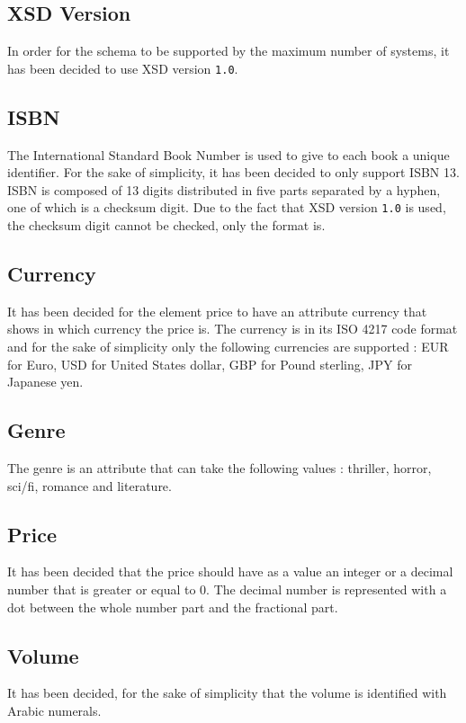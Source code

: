\documentclass{article}
\begin{document}
\subsection{XSD Version}
In order for the schema to be supported by the maximum number of systems, it has been decided to use XSD version \texttt{1.0}.

\subsection{ISBN}
The International Standard Book Number is used to give to each book a unique identifier. For the sake of simplicity, it has been decided to only support ISBN 13. ISBN is composed of 13 digits distributed in five parts separated by a hyphen, one of which is a checksum digit. Due to the fact that XSD version \texttt{1.0} is used, the checksum digit cannot be checked, only the format is.

\subsection{Currency}
It has been decided for the element price to have an attribute currency that shows in which currency the price is.
The currency is in its ISO 4217 code format and for the sake of simplicity only the following currencies are supported : EUR for Euro, USD for United States dollar, GBP for Pound sterling, JPY for Japanese yen.

\subsection{Genre}
The genre is an attribute that can take the following values : thriller, horror, sci/fi, romance and literature.

\subsection{Price}
It has been decided that the price should have as a value an integer or a decimal number that is greater or equal to 0. The decimal number is represented with a dot between the whole number part and the fractional part.

\subsection{Volume}
It has been decided, for the sake of simplicity that the volume is identified with Arabic numerals.
\end{document}
